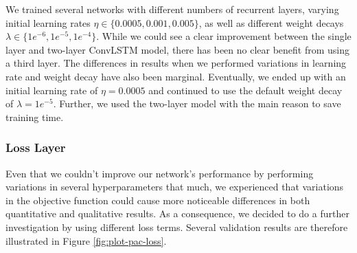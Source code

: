 We trained several networks with different numbers of recurrent layers, varying initial learning rates $\eta \in \{0.0005, 0.001, 0.005\}$, as well as different weight decays $\lambda \in \{1e^{-6}, 1e^{-5}, 1e^{-4}\} $. While we could see a clear improvement between the single layer and two-layer ConvLSTM model, there has been no clear benefit from using a third layer. The differences in results when we performed variations in learning rate and weight decay have also been marginal. Eventually, we ended up with an initial learning rate of $\eta = 0.0005 $ and continued to use the default weight decay of $\lambda = 1e^{-5}$. Further, we used the two-layer model with the main reason to save training time.


\subsubsection*{Loss Layer}

Even that we couldn't improve our network's performance by performing variations in several hyperparameters that much, we experienced that variations in the objective function could cause more noticeable differences in both quantitative and qualitative results. As a consequence, we decided to do a further investigation by using different loss terms. Several validation results are therefore illustrated in Figure \ref{fig:plot-pac-loss}. 

